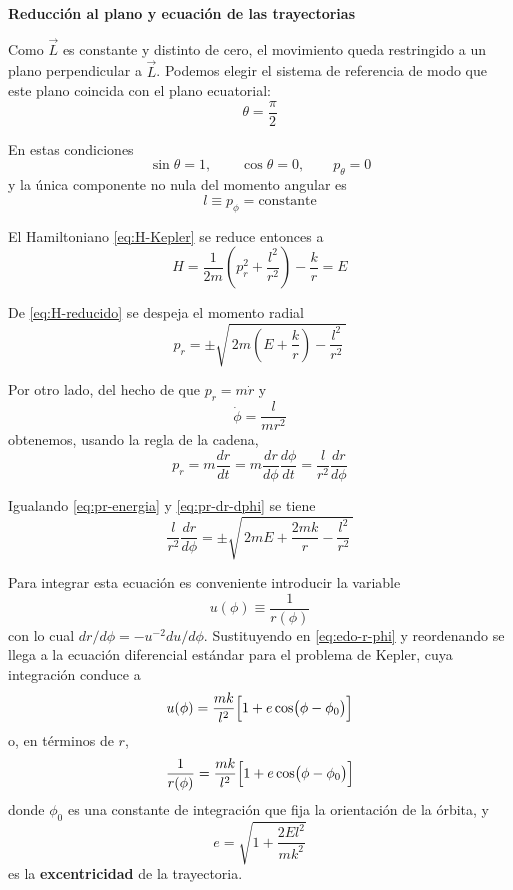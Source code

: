 \documentclass{article}
\begin{document}
\textcolor{trueblue}{\textbf{Reducción al plano y ecuación de las trayectorias}}

Como $\vec L$ es constante y distinto de cero, el movimiento queda restringido
a un plano perpendicular a $\vec L$. Podemos elegir el sistema de referencia de
modo que este plano coincida con el plano ecuatorial:
\[
\theta = \frac{\pi}{2}
\]

En estas condiciones
\[
\sin\theta = 1,
\qquad
\cos\theta = 0,
\qquad
p_{\theta} = 0
\]
y la única componente no nula del momento angular es
\[
l \equiv p_{\phi} = \text{constante}
\]

El Hamiltoniano \eqref{eq:H-Kepler} se reduce entonces a
\begin{equation}
H = \frac{1}{2m}\left(p_{r}^{2} + \frac{l^{2}}{r^{2}}\right) - \frac{k}{r}
= E
\label{eq:H-reducido}
\end{equation}

De \eqref{eq:H-reducido} se despeja el momento radial
\begin{equation}
p_{r}
= \pm\sqrt{\,2m\left(E + \frac{k}{r}\right)
          - \frac{l^{2}}{r^{2}}\,}
\label{eq:pr-energia}
\end{equation}

Por otro lado, del hecho de que $p_{r} = m\dot r$ y
\[
\dot\phi = \frac{l}{m r^{2}}
\]
obtenemos, usando la regla de la cadena,
\begin{equation}
p_{r} = m\frac{dr}{dt}
= m\frac{dr}{d\phi}\frac{d\phi}{dt}
= \frac{l}{r^{2}}\frac{dr}{d\phi}
\label{eq:pr-dr-dphi}
\end{equation}

Igualando \eqref{eq:pr-energia} y \eqref{eq:pr-dr-dphi} se tiene
\begin{equation}
\frac{l}{r^{2}}\frac{dr}{d\phi}
=
\pm\sqrt{\,2mE + \frac{2mk}{r} - \frac{l^{2}}{r^{2}}\,}
\label{eq:edo-r-phi}
\end{equation}

Para integrar esta ecuación es conveniente introducir la variable
\begin{equation}
u(\phi) \equiv \frac{1}{r(\phi)}
\label{eq:def-u}
\end{equation}
con lo cual $dr/d\phi = -u^{-2}du/d\phi$. Sustituyendo en
\eqref{eq:edo-r-phi} y reordenando se llega a la ecuación diferencial estándar
para el problema de Kepler, cuya integración conduce a
\begin{equation}
u(\phi)
= \frac{mk}{l^{2}}\Bigl[1 + e\cos\bigl(\phi-\phi_{0}\bigr)\Bigr]
\label{eq:u-orbita}
\end{equation}
o, en términos de $r$,
\begin{equation}
\frac{1}{r(\phi)}
= \frac{mk}{l^{2}}\Bigl[1 + e\cos\bigl(\phi-\phi_{0}\bigr)\Bigr]
\label{eq:orbita-conica}
\end{equation}
donde $\phi_{0}$ es una constante de integración que fija la orientación de la
órbita, y
\begin{equation}
e
=
\sqrt{1 + \frac{2 E l^{2}}{m k^{2}}}
\label{eq:excentricidad}
\end{equation}
es la \textbf{excentricidad} de la trayectoria.
\end{document}
